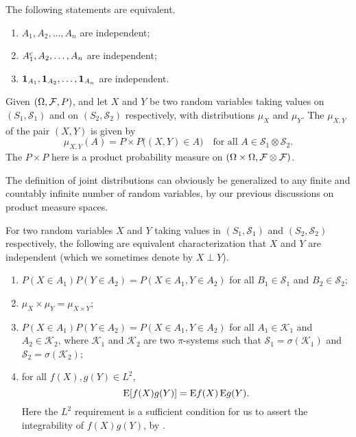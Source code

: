 \begin{prop}
    The following statements are equivalent.
    \begin{enumerate}
        \item $A_1,A_2,\dotsc,A_n$ are independent;
        \item $A_1^{\mathrm{c}},A_2,\dotsc,A_n$ are independent;
        \item $\mathbf{1}_{A_1},\mathbf{1}_{A_2},\dotsc,\mathbf{1}_{A_n}$ are independent.
    \end{enumerate}
\end{prop}

Given $(\Omega,\mathcal{F},P)$, and let $X$ and $Y$ be two random variables taking values on $(S_1,\mathcal S_1)$ and on $(S_2,\mathcal S_2)$ respectively, with distributions $\mu_X$ and $\mu_Y$. The  $\mu_{X,Y}$ of the pair $(X,Y)$ is given by \[
    \mu_{X,Y}(A) = P\times P\bigl((X,Y) \in A\bigr)\quad\text{for all }A\in \mathcal{S}_1\otimes\mathcal{S}_2.
\] The $P\times P$ here is a product probability measure on $(\Omega\times \Omega, \mathcal{F}\otimes \mathcal{F})$.

The definition of joint distributions can obviously be generalized to any finite and countably infinite number of random variables, by our previous discussions on product measure spaces.

\begin{thm} \label{thm:indep-char}
    For two random variables $X$ and $Y$ taking values in $(S_1,\mathcal S_1)$ and $(S_2,\mathcal S_2)$ respectively, the following are equivalent characterization that $X$ and $Y$ are independent (which we sometimes denote by $X \perp Y$).
    \begin{enumerate}
        \item $P(X\in A_1)P(Y \in A_2) = P(X \in A_1, Y\in A_2)$ for all $B_1\in \mathcal S_1$ and $B_2\in \mathcal S_2$;
        \item \label{enu:indep-prod-meas} $\mu_X \times \mu_Y = \mu_{X \times Y}$;
        \item $P(X\in A_1)P(Y \in A_2) = P(X \in A_1, Y\in A_2)$ for all $A_1\in \mathcal K_1$ and $A_2\in \mathcal K_2$, where $\mathcal K_1$ and $\mathcal K_2$ are two $\pi$-systems such that $\mathcal S_1 = \sigma(\mathcal K_1)$ and $\mathcal S_2 = \sigma(\mathcal K_2)$;
        \item \label{enu:indep-check-via-L2} for all $f(X), g(Y) \in L^2$, \[
            \mathop{}\!\mathrm{E}[f(X)g(Y)] = \mathop{}\!\mathrm{E} f(X)\mathop{}\!\mathrm{E} g(Y).
        \] Here the $L^2$ requirement is a sufficient condition for us to assert the integrability of $f(X)g(Y)$, by .
    \end{enumerate}
\end{thm}

